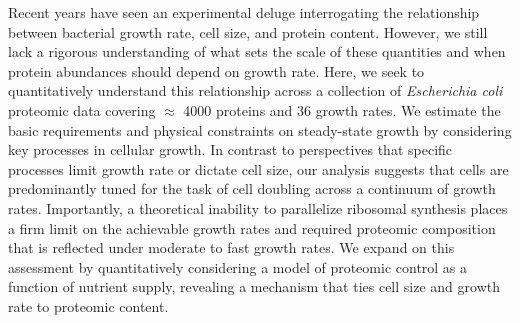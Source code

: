 Recent years have seen an experimental deluge interrogating the relationship
between bacterial growth rate, cell size, and protein content. However, we still
lack a rigorous understanding of what sets the scale of these quantities and
when protein abundances should depend on growth rate. Here, we
seek to quantitatively understand this relationship across a collection of
\textit{Escherichia coli} proteomic data covering $\approx$ 4000 proteins and 36
growth rates. We estimate the basic requirements and physical constraints on
steady-state growth by considering key processes in cellular growth. In contrast to
perspectives that specific processes limit growth rate or dictate cell size, our
analysis suggests that cells are predominantly tuned for the task of cell doubling
across a continuum of growth rates. Importantly, a theoretical inability to
parallelize ribosomal synthesis places a firm limit on the achievable growth rates
and required proteomic composition that is reflected under moderate to fast growth rates.
We expand on this assessment by quantitatively considering a model of proteomic
control as a function of nutrient supply, revealing a mechanism that ties cell size
and growth rate to proteomic content.
